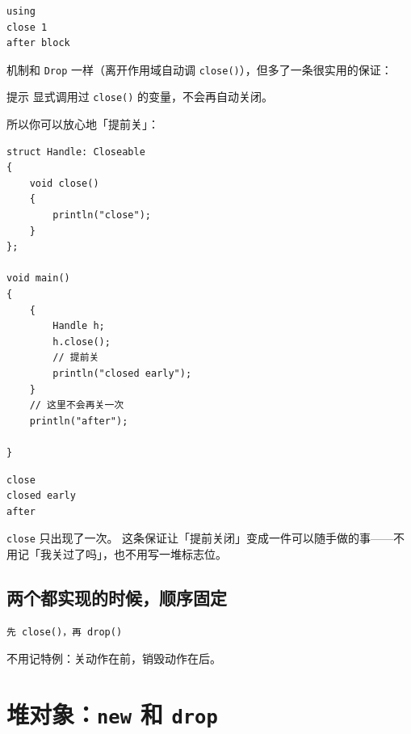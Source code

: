 \par
\medskip
\begin{lstlisting}[style=out]
using
close 1
after block
\end{lstlisting}
\par
\medskip

机制和 \texttt{Drop} 一样（离开作用域自动调 \texttt{close(\allowbreak{})\allowbreak{}}），但多了一条很实用的保证：

\begin{tip}{提示}
显式调用过 \texttt{close(\allowbreak{})\allowbreak{}} 的变量，不会再自动关闭。
\end{tip}

所以你可以放心地「提前关」：

\par
\medskip
\begin{lstlisting}[style=chali]
struct Handle: Closeable
{
    void close()
    {
        println("close");
    }
};

void main()
{
    {
        Handle h;
        h.close();
        // 提前关
        println("closed early");
    }
    // 这里不会再关一次
    println("after");

}
\end{lstlisting}
\par
\medskip

\par
\medskip
\begin{lstlisting}[style=out]
close
closed early
after
\end{lstlisting}
\par
\medskip

\texttt{close} 只出现了一次。 这条保证让「提前关闭」变成一件可以随手做的事——不用记「我关过了吗」，也不用写一堆标志位。

\subsection*{两个都实现的时候，顺序固定}

\par
\medskip
\begin{lstlisting}[style=out]
先 close()，再 drop()
\end{lstlisting}
\par
\medskip

不用记特例：关动作在前，销毁动作在后。

\section{堆对象：\texttt{new} 和 \texttt{drop}}

